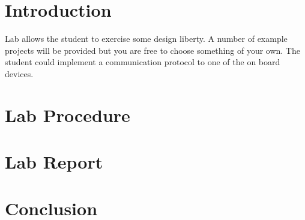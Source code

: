 \documentclass[12pt,journal]{IEEEtran}
\begin{document}




  \section{\bfseries Introduction}
     Lab allows the student to exercise some design liberty. A number of example projects will be provided but you are free to choose something of your own. The student could implement a communication protocol to one of the on board devices.

  \section{\bfseries Lab Procedure}
    
  \section{\bfseries  Lab Report}
    
  \section{\bfseries  Conclusion}
   
  
  
\end{document}
